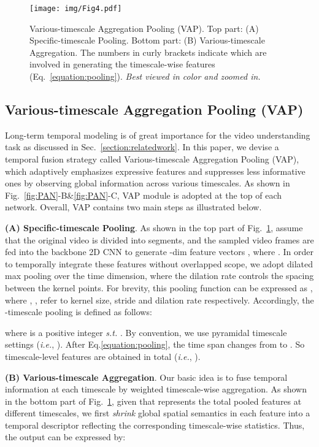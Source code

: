 \documentclass[journal]{IEEEtran}
\begin{document}
\begin{figure}[t]
\begin{center}
  \texttt{[image: img/Fig4.pdf]}
\end{center}
   \caption{Various-timescale Aggregation Pooling (VAP). Top part: (A) Specific-timescale Pooling. Bottom part: (B) Various-timescale Aggregation. The numbers in curly brackets indicate which  are involved in generating the timescale-wise features  (Eq.~\ref{equation:pooling}). \emph{Best viewed in color and zoomed in.}}
\label{fig:VAP}
\end{figure}


\subsection{Various-timescale Aggregation Pooling (VAP)} \label{section:VAP}

Long-term temporal modeling is of great importance for the video understanding task as discussed in Sec.~\ref{section:relatedwork}. In this paper, we devise a temporal fusion strategy called Various-timescale Aggregation Pooling (VAP), which adaptively emphasizes expressive features and suppresses less informative ones by observing global information across various timescales. As shown in Fig.~\ref{fig:PAN}-B\&\ref{fig:PAN}-C, VAP module is adopted at the top of each network. Overall, VAP contains two main steps as illustrated below.

\textbf{(A) Specific-timescale Pooling}. As shown in the top part of Fig.~\ref{fig:VAP}, assume that the original video is divided into  segments, and the sampled video frames are fed into the backbone 2D CNN to generate -dim feature vectors , where . In order to temporally integrate these  features without overlapped scope, we adopt dilated max pooling over the time dimension, where the dilation rate controls the spacing between the kernel points. For brevity, this pooling function can be expressed as , where , ,  refer to kernel size, stride and dilation rate respectively. Accordingly, the -timescale pooling is defined as follows:

where  is a positive integer \emph{s.t.} . By convention, we use pyramidal timescale settings (\emph{i.e.}, ). After Eq.\ref{equation:pooling}, the time span changes from  to . So  timescale-level features are obtained in total (\emph{i.e.}, ).





\textbf{(B) Various-timescale Aggregation}. Our basic idea is to fuse temporal information at each timescale by weighted timescale-wise aggregation. As shown in the bottom part of Fig.~\ref{fig:VAP}, given that  represents the total  pooled features at different timescales, we first \emph{shrink} global spatial semantics in each feature into a temporal descriptor reflecting the corresponding timescale-wise statistics. Thus, the output  can be expressed by:
\end{document}
